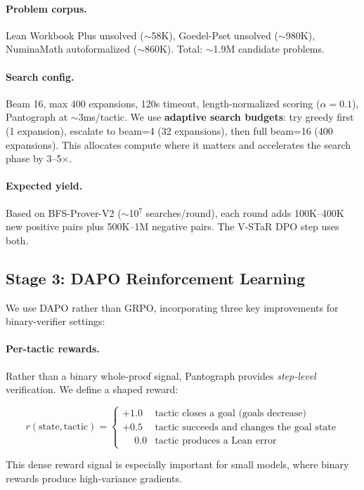 \documentclass[11pt,a4paper]{article}
\begin{document}
\paragraph{Problem corpus.} Lean Workbook Plus unsolved ($\sim$58K), Goedel-Pset unsolved ($\sim$980K), NuminaMath autoformalized ($\sim$860K). Total: $\sim$1.9M candidate problems.

\paragraph{Search config.} Beam 16, max 400 expansions, 120s timeout, length-normalized scoring ($\alpha = 0.1$), Pantograph at $\sim$3ms/tactic. We use \textbf{adaptive search budgets}: try greedy first (1 expansion), escalate to beam=4 (32 expansions), then full beam=16 (400 expansions). This allocates compute where it matters and accelerates the search phase by 3--5$\times$.

\paragraph{Expected yield.} Based on BFS-Prover-V2 ($\sim$10$^7$ searches/round), each round adds 100K--400K new positive pairs plus 500K--1M negative pairs. The V-STaR DPO step uses both.

\subsection{Stage 3: DAPO Reinforcement Learning}
\label{sec:stage3}

We use DAPO \citep{dapo} rather than GRPO, incorporating three key improvements for binary-verifier settings:

\paragraph{Per-tactic rewards.} Rather than a binary whole-proof signal, Pantograph provides \emph{step-level} verification. We define a shaped reward:

\[
r(\text{state}, \text{tactic}) = \begin{cases}
+1.0 & \text{tactic closes a goal (goals decrease)} \\
+0.5 & \text{tactic succeeds and changes the goal state} \\
\phantom{+}0.0 & \text{tactic produces a Lean error}
\end{cases}
\]

This dense reward signal is especially important for small models, where binary rewards produce high-variance gradients.
\end{document}
